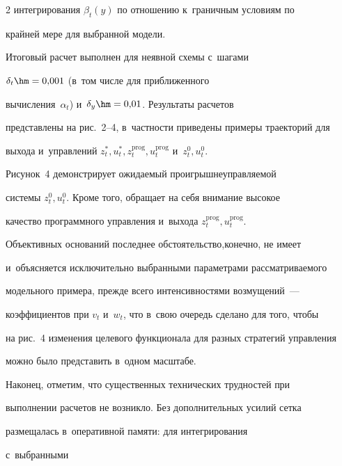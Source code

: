 \begin{multicols}{2}
интегрирования $\beta_t(y)$ по отношению к~граничным условиям по 


крайней мере для выбранной модели.


     


     Итоговый расчет выполнен для неявной схемы с~шагами 


$\delta_t\hm=0{,}001$ (в~том числе для приближенного 


вычисления~$\alpha_t$) и~$\delta_y\hm=0{,}01$. Результаты расчетов 


представлены на рис.~2--4, в~частности приведены примеры траекторий для 


выхода и~управлений $z_t^*, u_t^*, z_t^{\mathrm{prog}}, u_t^{\mathrm{prog}}$ и~$z_t^0, u_t^0$.











     Рисунок~4 демонстрирует ожидаемый проигрыш\linebreak неуправляемой 


системы $z_t^0, u_t^0$. Кроме того, обращает на себя внимание высокое 


качество про\-граммного управления и~выхода $z_t^{\mathrm{prog}}, u_t^{\mathrm{prog}}$. 


Объ\-ективных оснований последнее обстоятельство,\linebreak конечно, не имеет 


и~объясняется исключительно выбранными параметрами рассматриваемого 


модельного примера, прежде всего интенсивностями возмущений~--- 


коэффициентов при $v_t$ и~$w_t$, что в~свою очередь сделано для того, чтобы 


на рис.~4 изменения целевого функционала для разных стратегий управ\-ле\-ния 


можно было представить в~одном масштабе.


     


     Наконец, отметим, что существенных техниче\-ских трудностей при 


выполнении расчетов не возникло. Без дополнительных усилий сетка 


размещалась в~оперативной памяти: для интегрирования\linebreak


 с~выбранными 



\end{multicols}
